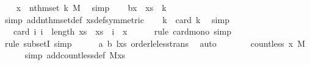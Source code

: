 \begin{isabellebody}
\ \ \isamarkupfalse%
\ {\isachardoublequoteopen}x\ {\isachargreater}{\kern0pt}\ nth{\isacharunderscore}{\kern0pt}mset\ k\ M{\isachardoublequoteclose}\ \isamarkupfalse%
\ simp\isanewline
\ \ \isamarkupfalse%
\ b{\isacharcolon}{\kern0pt}{\isachardoublequoteopen}x\ {\isachargreater}{\kern0pt}\ xs\ {\isacharbang}{\kern0pt}\ k{\isachardoublequoteclose}\ \isamarkupfalse%
\ {\isacharparenleft}{\kern0pt}simp\ add{\isacharcolon}{\kern0pt}nth{\isacharunderscore}{\kern0pt}mset{\isacharunderscore}{\kern0pt}def\ xs{\isacharunderscore}{\kern0pt}def{\isacharbrackleft}{\kern0pt}symmetric{\isacharbrackright}{\kern0pt}{\isacharparenright}{\kern0pt}\isanewline
\isanewline
\ \ \isamarkupfalse%
\ {\isachardoublequoteopen}k\ {\isacharless}{\kern0pt}\ card\ {\isacharbraceleft}{\kern0pt}{}{\isachardot}{\kern0pt}{\isachardot}{\kern0pt}k{\isacharbraceright}{\kern0pt}{\isachardoublequoteclose}\ \isamarkupfalse%
\ simp\isanewline
\ \ \isamarkupfalse%
\ \isamarkupfalse%
\ {\isachardoublequoteopen}{\isachardot}{\kern0pt}{\isachardot}{\kern0pt}{\isachardot}{\kern0pt}\ {\isasymle}\ card\ {\isacharbraceleft}{\kern0pt}i{\isachardot}{\kern0pt}\ i\ {\isacharless}{\kern0pt}\ length\ xs\ {\isasymand}\ xs\ {\isacharbang}{\kern0pt}\ i\ {\isacharless}{\kern0pt}\ x{\isacharbraceright}{\kern0pt}{\isachardoublequoteclose}\isanewline
\ \ \ \ \isamarkupfalse%
\ {\isacharparenleft}{\kern0pt}rule\ card{\isacharunderscore}{\kern0pt}mono{\isacharcomma}{\kern0pt}\ simp{\isacharparenright}{\kern0pt}\isanewline
\ \ \ \ \isamarkupfalse%
\ {\isacharparenleft}{\kern0pt}rule\ subsetI{\isacharcomma}{\kern0pt}\ simp{\isacharparenright}{\kern0pt}\isanewline
\ \ \ \ \isamarkupfalse%
\ a\ b\ l{\isacharunderscore}{\kern0pt}xs\ order{\isacharunderscore}{\kern0pt}le{\isacharunderscore}{\kern0pt}less{\isacharunderscore}{\kern0pt}trans\ \isamarkupfalse%
\ auto\isanewline
\ \ \isamarkupfalse%
\ \isamarkupfalse%
\ {\isachardoublequoteopen}{\isachardot}{\kern0pt}{\isachardot}{\kern0pt}{\isachardot}{\kern0pt}\ {\isacharequal}{\kern0pt}\ count{\isacharunderscore}{\kern0pt}less\ x\ M{\isachardoublequoteclose}\isanewline
\ \ \ \ \isamarkupfalse%
\ {\isacharparenleft}{\kern0pt}simp\ add{\isacharcolon}{\kern0pt}count{\isacharunderscore}{\kern0pt}less{\isacharunderscore}{\kern0pt}def\ M{\isacharunderscore}{\kern0pt}xs{\isacharparenright}{\kern0pt}\isanewline
\ \ \ \ \isamarkupfalse%

\end{isabellebody}

